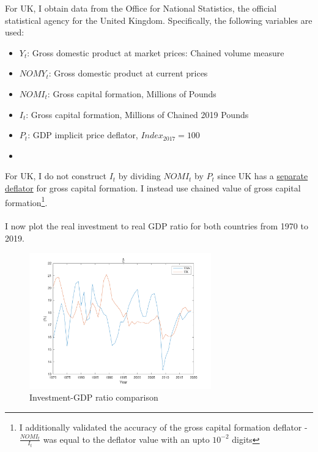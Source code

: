 \documentclass[11pt]{article}
\theoremstyle{mytheoremstyle}
\theoremstyle{mytheoremstyle}
\theoremstyle{myproblemstyle}
\begin{document}
For UK, I obtain data from the Office for National Statistics, the official statistical agency for the United Kingdom. Specifically, the following variables are used: 

\begin{itemize}
    \item $Y_t$: Gross domestic product at market prices: Chained volume measure
    \item $NOMY_t$:  Gross domestic product at current prices
    \item $NOMI_t$: Gross capital formation, Millions of Pounds
    \item $I_t$: Gross capital formation, Millions of Chained 2019 Pounds
    \item $P_t$: GDP implicit price deflator, $Index_{2017} = 100$
    \item 
\end{itemize}

\noindent For UK, I do not construct $I_t$ by dividing $NOMI_t$ by $P_t$ since UK has a \href{https://www.ons.gov.uk/economy/grossdomesticproductgdp/timeseries/ybfu/ukea}{separate deflator} for gross capital formation. I instead use chained value of gross capital formation\footnote{I additionally validated the accuracy of the gross capital formation deflator - $\frac{NOMI_t}{I_t}$ was equal to the deflator value with an upto $10^{-2}$ digits}.
\\ \\ 

\noindent I now plot the real investment to real GDP ratio for both countries from 1970 to 2019.

\begin{figure}[ht]
    \includegraphics[width=0.7\textwidth]{out/Investment.pdf}
    \centering
    \caption{Investment-GDP ratio comparison}
\end{figure}
\end{document}
